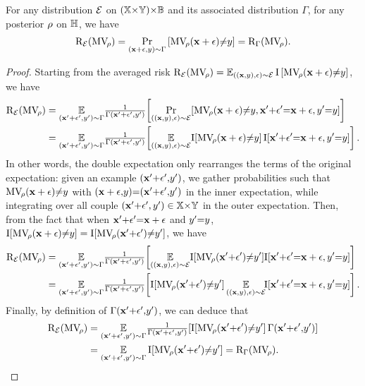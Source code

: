 \begin{noaddcontents}
\begin{lemma}
For any distribution ${\mathcal{E}}$ on $(\mathbb{X}{\times}\mathbb{Y}){\times}\mathbb{B}$ and its associated distribution $\Gamma$, for any posterior $\rho$ on $\mathbb{H}$, we have
\label{chap:mv-robustness:lemma:Delta}
\begin{align*}
    \text{R}_{{\mathcal{E}}}(\text{MV}_{\!\rho}) = \Pr_{(\mathbf{x}+\epsilon, y)\sim\Gamma}\left[ \text{MV}_{\!\rho}(\mathbf{x}+\epsilon){\ne}y\right] = \text{R}_{\Gamma}(\text{MV}_{\!\rho}).
\end{align*}
\end{lemma}
\begin{proof}
Starting from the averaged risk $\text{R}_{{\mathcal{E}}}(\text{MV}_{\!\rho})=\operatorname*{\mathbb{E}}_{((\mathbf{x},y){,}\epsilon)\sim{\ensuremath{\mathcal{E}}}}\operatorname{I}\left[\text{MV}_{\!\rho}(\mathbf{x}+\epsilon){\ne}y\right]$, we have
\begin{align*}
    \Risk_{\Dpert}(\MVQ) &= \EE_{(\x'{+}\epsilon', \y')\sim \Gamma}\!\tfrac{1}{\Gamma(\x'{+}\epsilon'{,}\y')}\!\LB\Pr_{((\x,\y),\epsilon)\sim\Dpert}\!\LB\MVQ(\x+\epsilon){\ne}y, \x'{+}\epsilon'{=}\x+\epsilon, \y'{=}y\RB\RB\\
    &= \EE_{(\x'{+}\epsilon', \y')\sim \Gamma}\!\tfrac{1}{\Gamma(\x'{+}\epsilon'{,}\y')}\!\LB
    \EE_{((\x,\y),\epsilon)\sim\Dpert}\!\indic\!\LB\MVQ(\x+\epsilon){\ne}y\RB \indic\!\LB \x'{+}\epsilon'{=}\x+\epsilon, \y'{=}y\RB\RB.\\
\end{align*}
In other words, the double expectation only rearranges the terms of the original expectation: given an example $(\mathbf{x}'{+}\epsilon'{,}y')$, we gather probabilities such that $\text{MV}_{\!\rho}(\mathbf{x}+\epsilon){\ne}y$ with $(\mathbf{x}+\epsilon{,}y) {=} (\mathbf{x}'{+}\epsilon'{,}y')$ in the inner expectation, while integrating over all couple $(\mathbf{x}'{+}\epsilon', y')\in\mathbb{X}{\times}\mathbb{Y}$ in the outer expectation.
Then, from the fact that when $\mathbf{x}'{+}\epsilon'{=}\mathbf{x}+\epsilon$ and $y'{=}y$, $\operatorname{I}\!\left[\text{MV}_{\!\rho}(\mathbf{x}+\epsilon){\ne}y\right]=\operatorname{I}\!\left[\text{MV}_{\!\rho}(\mathbf{x}'{+}\epsilon'){\ne} y'\right]$, we have 
\begin{align*}
    \Risk_{\Dpert}(\MVQ) &= \EE_{(\x'{+}\epsilon', \y')\sim \Gamma}\!\tfrac{1}{\Gamma(\x'{+}\epsilon'{, }\y')}\!\LB\EE_{((\x,\y),\epsilon)\sim\Dpert}\!\indic\!\LB\MVQ(\x'{+}\epsilon'){\ne}\y'\RB\!\indic\!\LB \x'{+}\epsilon'{=}\x+\epsilon, \y'{=}y\RB\RB\\
    &= \EE_{(\x'{+}\epsilon', \y')\sim\Gamma}\!\tfrac{1}{\Gamma(\x'{+}\epsilon'{, }\y')}\!\LB\indic\!\LB\MVQ(\x'{+}\epsilon'){\ne}\y'\RB\EE_{((\x,\y),\epsilon)\sim\Dpert}\!\!\indic\!\LB \x'{+}\epsilon'{=}\x+\epsilon, \y'{=}y\RB\RB.
\end{align*}
Finally, by definition of $\Gamma(\mathbf{x}'{+}\epsilon'{,}y')$, we can deduce that
\begin{align*}
    \Risk_{\Dpert}(\MVQ) &=\EE_{(\x'{+}\epsilon', \y')\sim \Gamma}\!\tfrac{1}{\Gamma(\x'{+}\epsilon'{, }\y')}\!\LB\indic\!\LB\MVQ(\x'{+}\epsilon'){\ne}\y'\RB\Gamma(\x'{+}\epsilon'{,}\y') \RB\\
    &= \EE_{(\x'{+}\epsilon', \y')\sim \Gamma}\indic\!\LB\MVQ(\x'{+}\epsilon'){\ne}\y'\RB = \Risk_{\Gamma}(\MVQ).
\end{align*}\end{proof}


\end{noaddcontents}
